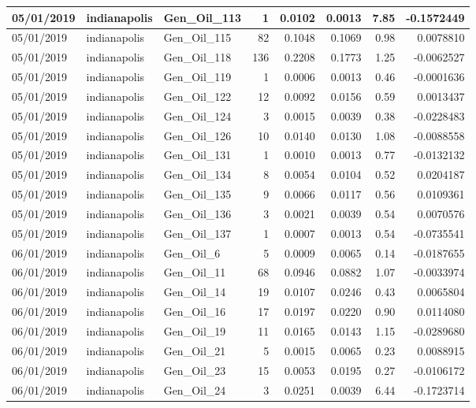 \documentclass[
  letterpaper,
  DIV=11,
  numbers=noendperiod]{scrartcl}
\begin{document}
\begin{tabular}{l|l|l|r|r|r|r|r}
\hline
05/01/2019 & indianapolis & Gen\_Oil\_113 & 1 & 0.0102 & 0.0013 & 7.85 & -0.1572449\\
\hline
05/01/2019 & indianapolis & Gen\_Oil\_115 & 82 & 0.1048 & 0.1069 & 0.98 & 0.0078810\\
\hline
05/01/2019 & indianapolis & Gen\_Oil\_118 & 136 & 0.2208 & 0.1773 & 1.25 & -0.0062527\\
\hline
05/01/2019 & indianapolis & Gen\_Oil\_119 & 1 & 0.0006 & 0.0013 & 0.46 & -0.0001636\\
\hline
05/01/2019 & indianapolis & Gen\_Oil\_122 & 12 & 0.0092 & 0.0156 & 0.59 & 0.0013437\\
\hline
05/01/2019 & indianapolis & Gen\_Oil\_124 & 3 & 0.0015 & 0.0039 & 0.38 & -0.0228483\\
\hline
05/01/2019 & indianapolis & Gen\_Oil\_126 & 10 & 0.0140 & 0.0130 & 1.08 & -0.0088558\\
\hline
05/01/2019 & indianapolis & Gen\_Oil\_131 & 1 & 0.0010 & 0.0013 & 0.77 & -0.0132132\\
\hline
05/01/2019 & indianapolis & Gen\_Oil\_134 & 8 & 0.0054 & 0.0104 & 0.52 & 0.0204187\\
\hline
05/01/2019 & indianapolis & Gen\_Oil\_135 & 9 & 0.0066 & 0.0117 & 0.56 & 0.0109361\\
\hline
05/01/2019 & indianapolis & Gen\_Oil\_136 & 3 & 0.0021 & 0.0039 & 0.54 & 0.0070576\\
\hline
05/01/2019 & indianapolis & Gen\_Oil\_137 & 1 & 0.0007 & 0.0013 & 0.54 & -0.0735541\\
\hline
06/01/2019 & indianapolis & Gen\_Oil\_6 & 5 & 0.0009 & 0.0065 & 0.14 & -0.0187655\\
\hline
06/01/2019 & indianapolis & Gen\_Oil\_11 & 68 & 0.0946 & 0.0882 & 1.07 & -0.0033974\\
\hline
06/01/2019 & indianapolis & Gen\_Oil\_14 & 19 & 0.0107 & 0.0246 & 0.43 & 0.0065804\\
\hline
06/01/2019 & indianapolis & Gen\_Oil\_16 & 17 & 0.0197 & 0.0220 & 0.90 & 0.0114080\\
\hline
06/01/2019 & indianapolis & Gen\_Oil\_19 & 11 & 0.0165 & 0.0143 & 1.15 & -0.0289680\\
\hline
06/01/2019 & indianapolis & Gen\_Oil\_21 & 5 & 0.0015 & 0.0065 & 0.23 & 0.0088915\\
\hline
06/01/2019 & indianapolis & Gen\_Oil\_23 & 15 & 0.0053 & 0.0195 & 0.27 & -0.0106172\\
\hline
06/01/2019 & indianapolis & Gen\_Oil\_24 & 3 & 0.0251 & 0.0039 & 6.44 & -0.1723714\\

\end{tabular}
\end{document}
